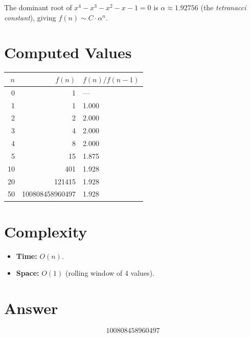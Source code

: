 \documentclass[11pt]{article}
\begin{document}
The dominant root of $x^4 - x^3 - x^2 - x - 1 = 0$ is $\alpha \approx 1.92756$ (the \emph{tetranacci constant}), giving $f(n) \sim C \cdot \alpha^n$.

\section{Computed Values}

\begin{center}
\begin{tabular}{rrl}
\toprule
$n$ & $f(n)$ & $f(n)/f(n-1)$ \\
\midrule
0 & 1 & --- \\
1 & 1 & 1.000 \\
2 & 2 & 2.000 \\
3 & 4 & 2.000 \\
4 & 8 & 2.000 \\
5 & 15 & 1.875 \\
10 & 401 & 1.928 \\
20 & 121415 & 1.928 \\
50 & 100808458960497 & 1.928 \\
\bottomrule
\end{tabular}
\end{center}

\section{Complexity}
\begin{itemize}
\item \textbf{Time:} $O(n)$.
\item \textbf{Space:} $O(1)$ (rolling window of 4 values).
\end{itemize}

\section{Answer}

\[
\boxed{100808458960497}
\]
\end{document}
